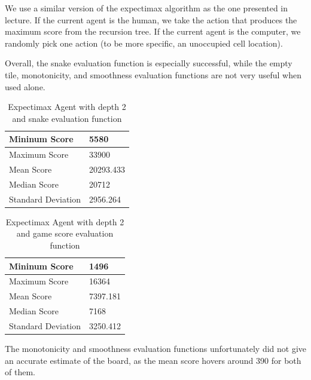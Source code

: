\documentclass[9pt,twocolumn]{article}
\begin{document}
We use a similar version of the expectimax algorithm as the one presented in lecture. If the current agent is the human, we take the action that produces the maximum score from the recursion tree. If the current agent is the computer, we randomly pick one action (to be more specific, an unoccupied cell location).

Overall, the snake evaluation function is especially successful, while the empty tile, monotonicity, and smoothness evaluation functions are not very useful when used alone.

\begin{table}[!htbp]

\centering

\begin{tabular}{|l|l|}
\hline
Mininum Score      & 5580 \\ \hline
Maximum Score      & 33900 \\ \hline
Mean Score         & 20293.433 \\ \hline
Median Score       & 20712 \\ \hline
Standard Deviation & 2956.264 \\ \hline
\end{tabular}

\caption{Expectimax Agent with depth 2 and snake evaluation function}

\end{table}

\begin{table}[!htbp]

\centering

\begin{tabular}{|l|l|}
\hline
Mininum Score      & 1496 \\ \hline
Maximum Score      & 16364 \\ \hline
Mean Score         & 7397.181 \\ \hline
Median Score       & 7168 \\ \hline
Standard Deviation & 3250.412 \\ \hline
\end{tabular}

\caption{Expectimax Agent with depth 2 and game score evaluation function}

\end{table}

The monotonicity and smoothness evaluation functions unfortunately did not give an accurate estimate of the board, as the mean score hovers around 390 for both of them.
\end{document}
